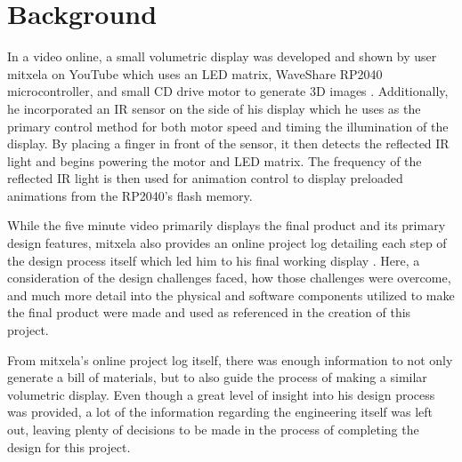 \documentclass[11pt,journal]{IEEEtran}
\begin{document}



\section{Background}

In a video online, a small volumetric display was developed and shown by user mitxela on YouTube which uses an LED matrix, WaveShare RP2040 microcontroller, and small CD drive motor to generate 3D images \cite{mitxela_candle}. Additionally, he incorporated an IR sensor on the side of his display which he uses as the primary control method for both motor speed and timing the illumination of the display. By placing a finger in front of the sensor, it then detects the reflected IR light and begins powering the motor and LED matrix. The frequency of the reflected IR light is then used for animation control to display preloaded animations from the RP2040’s flash memory. 

While the five minute video primarily displays the final product and its primary design features, mitxela also provides an online project log detailing each step of the design process itself which led him to his final working display . Here, a consideration of the design challenges faced, how those challenges were overcome, and much more detail into the physical and software components utilized to make the final product were made and used as referenced in the creation of this project. 

From mitxela’s online project log itself, there was enough information to not only generate a bill of materials, but to also guide the process of making a similar volumetric display. Even though a great level of insight into his design process was provided, a lot of the information regarding the engineering itself was left out, leaving plenty of decisions to be made in the process of completing the design for this project.
\end{document}
